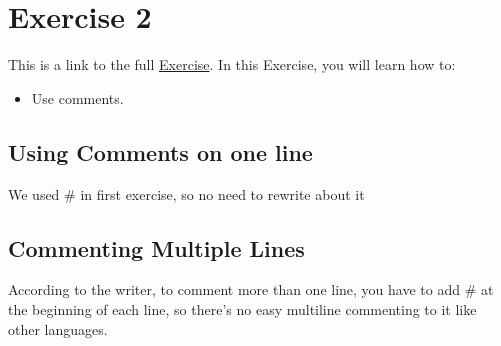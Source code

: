 \section*{Exercise 2}

This is a link to the full \href{https://github.com/alla1101/-PythonHardWay-/blob/master/Exercises/E02/ex2.py}{Exercise}. 
In this Exercise, you will learn how to:
\begin{itemize}
    \item Use comments.
\end{itemize}

\subsection*{Using Comments on one line}

We used \# in first exercise, so no need to rewrite about it

\subsection*{Commenting Multiple Lines}

According to the writer, to comment more than one line, you have to add \# at the beginning of each line, so there's no easy multiline commenting to it like other languages.